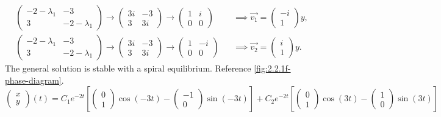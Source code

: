 \documentclass[12pt]{article}
\begin{document}
\begin{equation*}
  \begin{aligned}
    &\begin{pmatrix}-2-\lambda_1&-3\\3&-2-\lambda_1\end{pmatrix}
    \rightarrow\begin{pmatrix}3i&-3\\3&3i\end{pmatrix}
    \rightarrow\begin{pmatrix}1&i\\0&0\end{pmatrix}
    &&\implies \vec{v_1} = \begin{pmatrix}-i\\1\end{pmatrix}y, \\
    &\begin{pmatrix}-2-\lambda_1&-3\\3&-2-\lambda_1\end{pmatrix}
    \rightarrow\begin{pmatrix}3i&-3\\3&3i\end{pmatrix}
    \rightarrow\begin{pmatrix}1&-i\\0&0\end{pmatrix}
    &&\implies \vec{v_2} = \begin{pmatrix}i\\1\end{pmatrix}y.
  \end{aligned}
\end{equation*}
The general solution is stable with a spiral equilibrium. Reference
\cref{fig:2.2.1f-phase-diagram}.
$$
\boxed{\begin{pmatrix}x\\y\end{pmatrix}(t)=C_1e^{-2t}\left[\begin{pmatrix}0\\1\end{pmatrix}\cos(-3t)
  -\begin{pmatrix}-1\\0\end{pmatrix}\sin(-3t)\right]+
C_2e^{-2t}\left[\begin{pmatrix}0\\1\end{pmatrix}\cos(3t)
  -\begin{pmatrix}1\\0\end{pmatrix}\sin(3t)\right]}
$$
\end{document}
